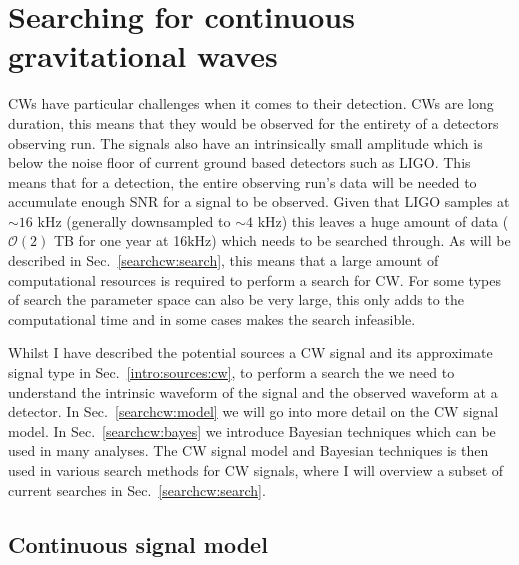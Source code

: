 \chapter{\label{searchcw}Searching for continuous gravitational waves}

\glspl{CW} have
particular challenges when it comes to their detection.  \glspl{CW} are long
duration, this means that they would be observed for the entirety of a
detectors observing run.  The signals also have an intrinsically small
amplitude which is below the noise floor of current ground based detectors such
as \gls{LIGO}.  This means that for a detection, the entire observing
run's data will be needed to
accumulate enough \gls{SNR} for a signal to be observed.  Given that \gls{LIGO}
samples at $\sim 16$ kHz (generally downsampled to $\sim 4$ kHz) this leaves a
huge amount of data ($\mathcal{O}(2)$ TB for one year at 16kHz) which needs to be searched through.  As will be described in Sec.~\ref{searchcw:search}, this means that a large amount of computational resources is required to perform a search for \gls{CW}.
For some types of search the parameter space can also be very large, this only
adds to the computational time and in some cases makes the search
infeasible.

Whilst I have described the potential sources a \gls{CW} signal and its approximate
signal type in Sec.~\ref{intro:sources:cw}, to perform a search the we need to understand the
intrinsic waveform of the signal and the observed waveform at a detector.  In 
Sec.~\ref{searchcw:model} we will go into more
detail on the \gls{CW} signal model. In Sec.~\ref{searchcw:bayes} we introduce Bayesian techniques which can be used in many analyses. The \gls{CW} signal model and Bayesian techniques is then used in various search methods for
\gls{CW} signals, where I will overview a subset of current searches in
Sec.~\ref{searchcw:search}.

\section{\label{searchcw:model}Continuous signal model}

